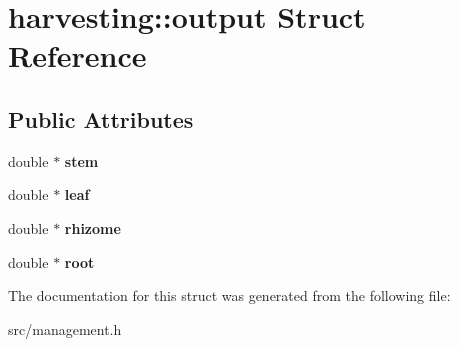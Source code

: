 \hypertarget{structharvesting_1_1output}{\section{harvesting\-:\-:output Struct Reference}
\label{structharvesting_1_1output}
}
\subsection*{Public Attributes}
\begin{DoxyCompactItemize}
\item 
\hypertarget{structharvesting_1_1output_afeb331d00db36185de99ddc7d4763377}{double $\ast$ {\bfseries stem}}\label{structharvesting_1_1output_afeb331d00db36185de99ddc7d4763377}

\item 
\hypertarget{structharvesting_1_1output_a4d9ea31909738e1573bfa3d290e4b6ae}{double $\ast$ {\bfseries leaf}}\label{structharvesting_1_1output_a4d9ea31909738e1573bfa3d290e4b6ae}

\item 
\hypertarget{structharvesting_1_1output_a217c7a32bee969d7b24323440202d9ab}{double $\ast$ {\bfseries rhizome}}\label{structharvesting_1_1output_a217c7a32bee969d7b24323440202d9ab}

\item 
\hypertarget{structharvesting_1_1output_ac20138189867415d7436e2f41b507d73}{double $\ast$ {\bfseries root}}\label{structharvesting_1_1output_ac20138189867415d7436e2f41b507d73}

\end{DoxyCompactItemize}


The documentation for this struct was generated from the following file\-:\begin{DoxyCompactItemize}
\item 
src/management.\-h\end{DoxyCompactItemize}
